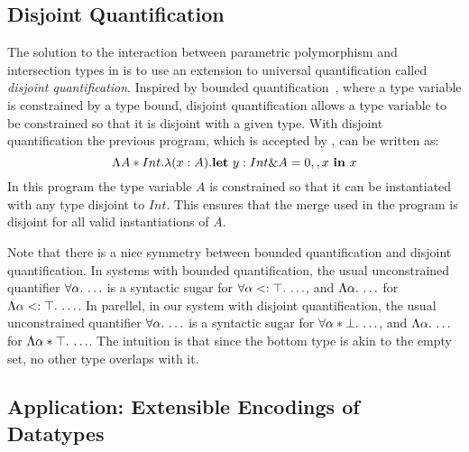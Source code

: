 \subsection{Disjoint Quantification}
The solution to the interaction between parametric polymorphism and
intersection types in \name is to use an extension to universal
quantification called \emph{disjoint quantification}.  Inspired by
bounded quantification~\cite{}, where a type variable is constrained by a type
bound, disjoint quantification allows a type variable to be
constrained so that it is disjoint with a
given type. With disjoint quantification the previous program, which
is accepted by \name, can be written as:
\[\Lambda A * Int.\lambda (x:A). {\bf let}~y : Int \& A = 0 ,, x~{\bf in}~x\]
In this program the type variable $A$ is constrained so that it can be
instantiated with any type disjoint to $Int$. This ensures that the
merge used in the program is disjoint for all valid instantiations of $A$.

Note that there is a nice symmetry between bounded quantification and disjoint quantification.
In systems with bounded quantification,
the usual unconstrained quantifier $\forall \alpha.\, \ldots$
is a syntactic sugar for $\forall \alpha <: \top.\, \ldots$, and
$\Lambda \alpha.\, \ldots$ for $\Lambda \alpha <: \top.\, \ldots$.
In parellel, in our system with disjoint quantification,
the usual unconstrained quantifier $\forall \alpha.\, \ldots$
is a syntactic sugar for $\forall \alpha * \bot.\, \ldots$, and
$\Lambda \alpha.\, \ldots$ for $\Lambda \alpha * \top.\, \ldots$.
The intuition is that since the bottom type is akin to the empty set,
no other type overlaps with it.

\begin{comment}
With this tool in hand, we can rewrite the program above to:
\[
\blam {\alpha \disjoint \tyint} {\lam x {\alpha \inter \tyint} x}
\]

This program typechecks because while $x$ is of type $\alpha \inter \tyint$,
and $\alpha$ is disjoint with $\tyint$. Similarly, in the new system,
the original program no longer typechecks, thus preventing overlapping types.
\end{comment}

\subsection{Application: Extensible Encodings of Datatypes}
\label{subsec:OAs}

